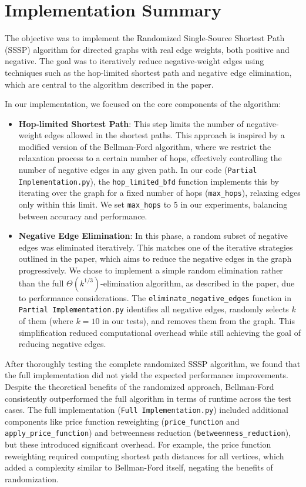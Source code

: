 \documentclass[12pt]{article}
\begin{document}
\section{Implementation Summary}
The objective was to implement the Randomized Single-Source Shortest Path (SSSP) algorithm for directed graphs with real edge weights, both positive and negative. The goal was to iteratively reduce negative-weight edges using techniques such as the hop-limited shortest path and negative edge elimination, which are central to the algorithm described in the paper.

In our implementation, we focused on the core components of the algorithm:
\begin{itemize}
    \item \textbf{Hop-limited Shortest Path}: This step limits the number of negative-weight edges allowed in the shortest paths. This approach is inspired by a modified version of the Bellman-Ford algorithm, where we restrict the relaxation process to a certain number of hops, effectively controlling the number of negative edges in any given path. In our code (\texttt{Partial Implementation.py}), the \texttt{hop\_limited\_bfd} function implements this by iterating over the graph for a fixed number of hops (\texttt{max\_hops}), relaxing edges only within this limit. We set \texttt{max\_hops} to 5 in our experiments, balancing between accuracy and performance.
    \item \textbf{Negative Edge Elimination}: In this phase, a random subset of negative edges was eliminated iteratively. This matches one of the iterative strategies outlined in the paper, which aims to reduce the negative edges in the graph progressively. We chose to implement a simple random elimination rather than the full \(\Theta(k^{1/3})\)-elimination algorithm, as described in the paper, due to performance considerations. The \texttt{eliminate\_negative\_edges} function in \texttt{Partial Implementation.py} identifies all negative edges, randomly selects \(k\) of them (where \(k=10\) in our tests), and removes them from the graph. This simplification reduced computational overhead while still achieving the goal of reducing negative edges.
\end{itemize}

After thoroughly testing the complete randomized SSSP algorithm, we found that the full implementation did not yield the expected performance improvements. Despite the theoretical benefits of the randomized approach, Bellman-Ford consistently outperformed the full algorithm in terms of runtime across the test cases. The full implementation (\texttt{Full Implementation.py}) included additional components like price function reweighting (\texttt{price\_function} and \texttt{apply\_price\_function}) and betweenness reduction (\texttt{betweenness\_reduction}), but these introduced significant overhead. For example, the price function reweighting required computing shortest path distances for all vertices, which added a complexity similar to Bellman-Ford itself, negating the benefits of randomization.
\end{document}
